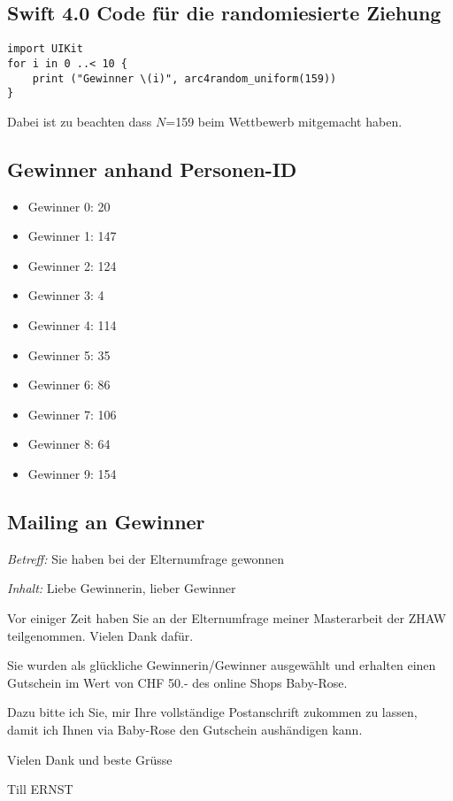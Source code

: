 \subsection*{Swift 4.0 Code für die randomiesierte Ziehung}

\begin{lstlisting}
import UIKit
for i in 0 ..< 10 {
    print ("Gewinner \(i)", arc4random_uniform(159))
}
\end{lstlisting}

Dabei ist zu beachten dass $N$=159 beim Wettbewerb mitgemacht haben.

\subsection*{Gewinner anhand Personen-ID}
\begin{itemize}
    \item Gewinner 0: 20
    \item Gewinner 1: 147
    \item Gewinner 2: 124
    \item Gewinner 3: 4
    \item Gewinner 4: 114
    \item Gewinner 5: 35
    \item Gewinner 6: 86
    \item Gewinner 7: 106
    \item Gewinner 8: 64
    \item Gewinner 9: 154
\end{itemize}

\subsection*{Mailing an Gewinner}
\begin{flushleft}
\textit{Betreff:}
Sie haben bei der Elternumfrage gewonnen

\textit{Inhalt:}
Liebe Gewinnerin, lieber Gewinner

Vor einiger Zeit haben Sie an der Elternumfrage meiner Masterarbeit der ZHAW teilgenommen. Vielen Dank dafür. 

Sie wurden als glückliche Gewinnerin/Gewinner ausgewählt und erhalten einen Gutschein im Wert von CHF 50.- des online Shops Baby-Rose.

Dazu bitte ich Sie, mir Ihre vollständige Postanschrift zukommen zu lassen, damit ich Ihnen via Baby-Rose den Gutschein aushändigen kann.

Vielen Dank und beste Grüsse

Till ERNST
\end{flushleft}